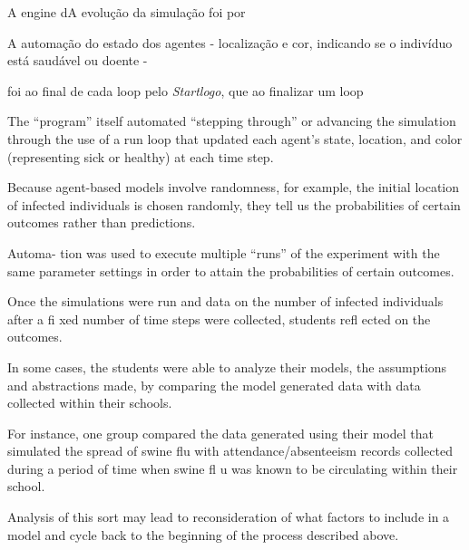  

A engine dA evolução da simulação foi  por 

A automação do estado dos agentes - localização e cor, indicando se o indivíduo está saudável ou doente - 




foi ao final de cada loop pelo \textit{Startlogo}, que ao finalizar um loop 



The “program” itself automated “stepping through” or advancing the simulation through the use of a run loop that updated each agent’s state, location, and color (representing sick or healthy) at each time step.

Because agent-based models involve randomness, for example, the initial location of infected individuals is chosen randomly, they tell us the probabilities of certain outcomes rather than predictions.

Automa- tion was used to execute multiple “runs” of the experiment with the same parameter settings in order to attain the probabilities of certain outcomes.

Once the simulations were run and data on the number of infected individuals after a fi xed number of time steps were collected, students refl ected on the outcomes.

In some cases, the students were able to analyze their models, the assumptions and abstractions made, by comparing the model generated data with data collected within their schools.

For instance, one group compared the data generated using their model that simulated the spread of swine flu with attendance/absenteeism records collected during a period of time when swine fl u was known to be circulating within their school.

Analysis of this sort may lead to reconsideration of what factors to include in a model and cycle back to the beginning of the process described above.

